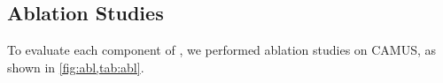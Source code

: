 \subsection{Ablation Studies}
    \label{subsec:abl}
To evaluate each component of \mymodel, we performed ablation studies on CAMUS, as shown in \cref{fig:abl,tab:abl}. 